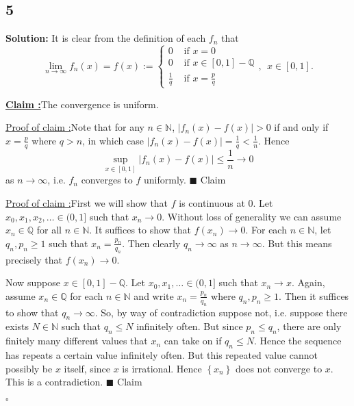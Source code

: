 \documentclass[12pt]{article}
\newcounter{ProofCounter}
\newcounter{ClaimCounter}[ProofCounter]
\newenvironment{Solution}{\stepcounter{ProofCounter}\textbf{Solution:}}{\hfill$\square$}
\newenvironment{claim}[1]{\vspace{1mm}\stepcounter{ClaimCounter}\par\noindent\underline{\bf Claim \theClaimCounter:}\space#1}{}
\newenvironment{claimproof}[1]{\par\noindent\underline{Proof of claim \theClaimCounter:}\space#1}{\hfill $\blacksquare$ Claim \theClaimCounter}
\begin{document}
\subsection*{5}
\begin{Solution}
  It is clear from the definition of each $f_{n}$ that 
  \[
    \lim_{n\rightarrow\infty} f_{n}(x) = f(x) := \left\{ \begin{array}{cl}
        0 & \text{ if } x = 0 \\
        0 & \text{ if } x \in [0,1] - \mathbb{Q} \\
        \frac{1}{q} & \text{ if } x = \frac{p}{q}
    \end{array} \right.,\ \  x \in [0,1].
  \]
  \begin{claim}
    The convergence is uniform.
  \end{claim}
  \begin{claimproof}
    Note that for any $n \in \mathbb{N}$, $|f_n(x) - f(x)| > 0$ if and only if $x = \frac{p}{q}$ where $q > n$, in which case $|f_n(x) - f(x)| =
    \frac{1}{q} < \frac{1}{n}$.
    Hence
    \[
      \sup_{x\in[0,1]}|f_n(x) - f(x)| \leq \frac{1}{n} \rightarrow 0
    \]
    as $n\rightarrow\infty$, i.e. $f_{n}$ converges to $f$ uniformly.
  \end{claimproof}

  \begin{claimproof}
    First we will show that $f$ is continuous at 0. Let $x_0, x_1, x_2, \dots \in (0,1]$ such that $x_n \rightarrow 0$. 
    Without loss of generality we can assume $x_n \in \mathbb{Q}$ for all $n \in \mathbb{N}$.
    It suffices to
    show that $f(x_n) \rightarrow 0$. For each $n \in \mathbb{N}$, let $q_n, p_{n} \geq 1$ such that $x_n = \frac{p_n}{q_n}$. Then clearly $q_n \rightarrow
    \infty$ as $n \rightarrow \infty$. But this means precisely that $f(x_n) \rightarrow 0$.

    Now suppose $x \in [0,1] - \mathbb{Q}$. Let $x_0, x_1, \dots \in (0,1]$ such that $x_n \rightarrow x$. Again, assume $x_n \in \mathbb{Q}$ for each
    $n \in \mathbb{N}$ and write $x_n = \frac{p_n}{q_n}$ where $q_n, p_n \geq 1$. Then it suffices to show that $q_n \rightarrow \infty$. So, by way
    of contradiction suppose not, i.e. suppose there exists $N \in \mathbb{N}$ such that $q_n \leq N$ infinitely often. But since $p_n \leq q_n$,
    there are only finitely many different values that $x_n$ can take on if $q_n \leq N$. Hence the sequence has repeats a certain value infinitely
    often. But this repeated value cannot possibly be $x$ itself, since $x$ is irrational. Hence $\left\{ x_n \right\}$ does not converge to $x$. This
    is a contradiction.
  \end{claimproof}

\end{Solution}
\end{document}
